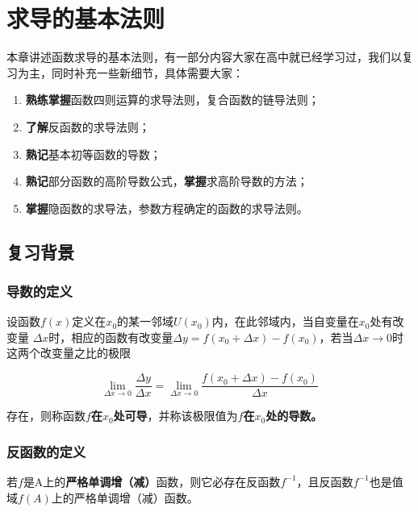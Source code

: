 \chapter{求导的基本法则}\label{ch:2}

本章讲述函数求导的基本法则，有一部分内容大家在高中就已经学习过，我们以复习为主，同时补充一些新细节，具体需要大家：

\begin{enumerate}
	\item \textbf{熟练掌握}函数四则运算的求导法则，复合函数的链导法则；
	\item \textbf{了解}反函数的求导法则；
	\item \textbf{熟记}基本初等函数的导数；
	\item \textbf{熟记}部分函数的高阶导数公式，\textbf{掌握}求高阶导数的方法；
	\item \textbf{掌握}隐函数的求导法，参数方程确定的函数的求导法则。
\end{enumerate}

\section{复习背景}\label{sec:2.1}

\subsection{导数的定义}\label{sec:2.1.1}

\begin{definition}
	设函数$f(x)$定义在$x_0$的某一邻域$U(x_0)$内，在此邻域内，当自变量在$x_0$处有改变量
	$\Delta{x}$时，相应的函数有改变量$\Delta{y}=f(x_0+\Delta{x})-f(x_0)$，若当$\Delta{x}\to{0}$时这两个改变量之比的极限
	
	\begin{equation}
		\lim_{\Delta{x}\to{0}}\frac{\Delta{y}}{\Delta{x}}=\lim_{\Delta{x}\to{0}}\frac{f(x_0+\Delta{x})-f(x_0)}{\Delta{x}}
		\label{eq:2.1}
	\end{equation}
	
	存在，则称函数$f$\textbf{在$x_0$处可导}，并称该极限值为$f$\textbf{在$x_0$处的导数。}
\end{definition}

\subsection{反函数的定义}\label{sec:2.1.2}

\begin{definition}
	若$f$是A上的\textbf{严格单调增（减）}函数，则它必存在反函数$f^{-1}$，且反函数$f^{-1}$也是值域$f(A)$上的严格单调增（减）函数。
\end{definition}

